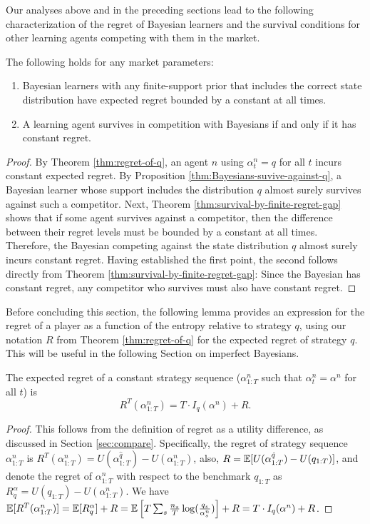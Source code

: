 Our analyses above and in the preceding sections lead to the following characterization of the regret of Bayesian learners and the survival conditions for other learning agents competing with them in the market. 

\begin{theorem}\label{thm:regret-of-a-Bayesian}
    The following holds for any market parameters:
    \begin{enumerate}
        \item Bayesian learners with any finite-support prior that includes the correct state distribution have expected regret bounded by a constant at all times.
        \item A learning agent survives in competition with Bayesians if and only if it has constant regret.
    \end{enumerate}
\end{theorem}
\begin{proof}
By Theorem \ref{thm:regret-of-q}, an agent $n$ using $\alpha^n_t = q$ for all $t$ incurs constant expected regret. By Proposition \ref{thm:Bayesians-suvive-against-q}, a Bayesian learner whose support includes the distribution $q$ almost surely survives against such a competitor. Next, Theorem \ref{thm:survival-by-finite-regret-gap} shows that if some agent survives against a competitor, then the difference between their regret levels must be bounded by a constant at all times. Therefore, the Bayesian competing against the state distribution $q$ almost surely incurs constant regret. 
% 
Having established the first point, the second follows directly from Theorem \ref{thm:survival-by-finite-regret-gap}: Since the Bayesian has constant regret, any competitor who survives must also have constant regret. 
\end{proof}

Before concluding this section, the following lemma provides an expression for the regret of a player as a function of the entropy relative to strategy $q$, using our notation $R$ from Theorem \ref{thm:regret-of-q} for the expected regret of strategy $q$. This will be useful in the following Section on imperfect Bayesians.

\begin{lemma}\label{thm:expected-regret-lemma}
    The expected regret of a constant strategy sequence ($\alpha^n_{1:T}$ such that $\alpha^n_t =  \alpha^n$ for all $t$) is 
    $$
    R^T(\alpha^n_{1:T}) = T \cdot I_q(\alpha^n) + R.
    $$ 
\end{lemma}
\begin{proof}
    This follows from the definition of regret as a utility difference, as discussed in Section \ref{sec:compare}. Specifically, the regret of strategy sequence $\alpha^n_{1:T}$ is $R^T(\alpha^n_{1:T}) = U(\alpha^{\hat{q}}_{1:T}) - U(\alpha^n_{1:T})$, also, $R = \operatorname{\mathbb{E}}[U(\alpha^{\hat{q}}_{1:T}) - U(q_{1:T})]$, and denote the regret of $\alpha^n_{1:T}$ with respect to the benchmark $q_{1:T}$ as $R^\alpha_q = U(q_{1:T}) - U(\alpha^n_{1:T})$. We have 
    $
    \operatorname{\mathbb{E}}[R^T(\alpha^n_{1:T})] = \operatorname{\mathbb{E}}[R^\alpha_q] + R = \operatorname{\mathbb{E}}\Big[ T \sum_s \frac{n_s}{T} \log(\frac{q_s}{\alpha^n_{s}}) \Big] + R = T \cdot I_q(\alpha^n) + R
    $.   
\end{proof}

